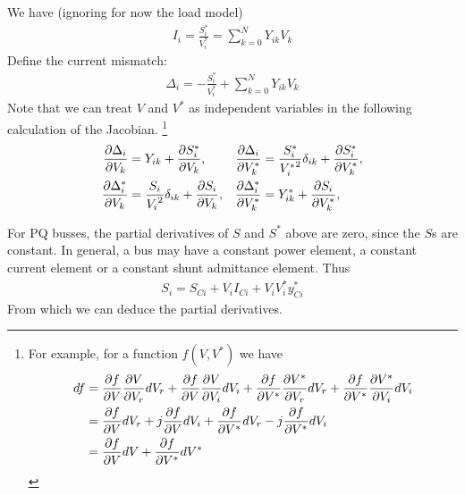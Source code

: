 \documentclass[11pt]{article}
\begin{document}
We have (ignoring for now the load model)
\begin{align}
I_i = \frac{S_i^*}{V_i^*} = \sum_{k=0}^NY_{ik}V_k
\end{align}
Define the current mismatch:
\begin{align}
\Delta_i = -\frac{S^*_i}{V_i^*} + \sum_{k=0}^NY_{ik}V_k
\end{align}
Note that we can treat $V$ and $V^*$ as independent variables in the following calculation of the Jacobian. 
\footnote{
	For example, for a function $f(V, V^*)$ we have
	\begin{align}
	df &= \frac{\partial f}{\partial V} \frac{\partial V}{\partial V_r}dV_r  +  \frac{\partial f}{\partial V} \frac{\partial V}{\partial V_i}dV_i +  \frac{\partial f}{\partial V^*} \frac{\partial V^*}{\partial V_r}dV_r  + \frac{\partial f}{\partial V^*} \frac{\partial V^*}{\partial V_i}dV_i \notag \\
	&= \frac{\partial f}{\partial V} dV_r  + j\frac{\partial f}{\partial V}dV_i +  \frac{\partial f}{\partial V^*}dV_r  - j\frac{\partial f}{\partial V^*} dV_i \notag \\
	&= \frac{\partial f}{\partial V} dV +  \frac{\partial f}{\partial V^*}dV^* \notag
	\end{align}
}
\begin{align}
\frac{\partial \Delta_i}{\partial V_k} &= Y_{ik} + \frac{\partial S^*_i}{\partial V_k}, &\frac{\partial \Delta_i}{\partial V^*_k} &=  \frac{S^*_i}{{V^*_i}^2}\delta_{ik} + \frac{\partial S^*_i}{\partial V^*_k},  \notag \\
\frac{\partial \Delta^*_i}{\partial V_k} &= \frac{S_i}{{V_i}^2}\delta_{ik} + \frac{\partial S_i}{\partial V_k}, &\frac{\partial \Delta^*_i}{\partial V^*_k} &= Y^*_{ik} + \frac{\partial S_i}{\partial V^*_k},
\end{align}

For PQ busses, the partial derivatives of $S$ and $S^*$ above are zero, since the $S$s are constant. In general, a bus may have a constant power element, a constant current element or a constant shunt admittance element. Thus
\begin{align}
S_i = S_{Ci} + V_iI_{Ci} + V_iV^*_iy^*_{Ci}
\end{align}
From which we can deduce the partial derivatives.
\end{document}

